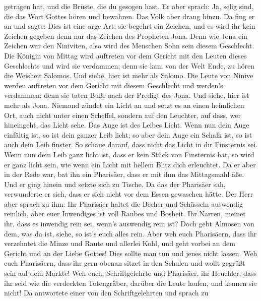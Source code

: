getragen hat, und die Brüste, die du gesogen hast.  Er aber
sprach: Ja, selig sind, die das Wort Gottes hören und bewahren.
 Das Volk aber drang hinzu. Da fing er an und sagte: Dies
ist eine arge Art; sie begehrt ein Zeichen, und es wird ihr kein Zeichen
gegeben denn nur das Zeichen des Propheten Jona.  Denn wie
Jona ein Zeichen war den Niniviten, also wird des Menschen Sohn sein
diesem Geschlecht.  Die Königin von Mittag wird auftreten
vor dem Gericht mit den Leuten dieses Geschlechts und wird sie
verdammen; denn sie kam von der Welt Ende, zu hören die Weisheit
Salomos. Und siehe, hier ist mehr als Salomo.  Die Leute
von Ninive werden auftreten vor dem Gericht mit diesem Geschlecht und
werden's verdammen; denn sie taten Buße nach der Predigt des Jona. Und
siehe, hier ist mehr als Jona.  Niemand zündet ein Licht an
und setzt es an einen heimlichen Ort, auch nicht unter einen Scheffel,
sondern auf den Leuchter, auf dass, wer hineingeht, das Licht sehe.
 Das Auge ist des Leibes Licht. Wenn nun dein Auge
einfältig ist, so ist dein ganzer Leib licht; so aber dein Auge ein
Schalk ist, so ist auch dein Leib finster.  So schaue
darauf, dass nicht das Licht in dir Finsternis sei.  Wenn
nun dein Leib ganz licht ist, dass er kein Stück von Finsternis hat, so
wird er ganz licht sein, wie wenn ein Licht mit hellem Blitz dich
erleuchtet.  Da er aber in der Rede war, bat ihn ein
Pharisäer, dass er mit ihm das Mittagsmahl äße. Und er ging hinein und
setzte sich zu Tische.  Da das der Pharisäer sah,
verwunderte er sich, dass er sich nicht vor dem Essen gewaschen hätte.
 Der Herr aber sprach zu ihm: Ihr Pharisäer haltet die
Becher und Schüsseln auswendig reinlich, aber euer Inwendiges ist voll
Raubes und Bosheit.  Ihr Narren, meinet ihr, dass es
inwendig rein sei, wenn's auswendig rein ist?  Doch gebt
Almosen von dem, was da ist, siehe, so ist's euch alles rein.
 Aber weh euch Pharisäern, dass ihr verzehntet die Minze
und Raute und allerlei Kohl, und geht vorbei an dem Gericht und an der
Liebe Gottes! Dies sollte man tun und jenes nicht lassen. 
Weh euch Pharisäern, dass ihr gern obenan sitzet in den Schulen und
wollt gegrüßt sein auf dem Markte!  Weh euch,
Schriftgelehrte und Pharisäer, ihr Heuchler, dass ihr seid wie die
verdeckten Totengräber, darüber die Leute laufen, und kennen sie nicht!
 Da antwortete einer von den Schriftgelehrten und sprach zu
